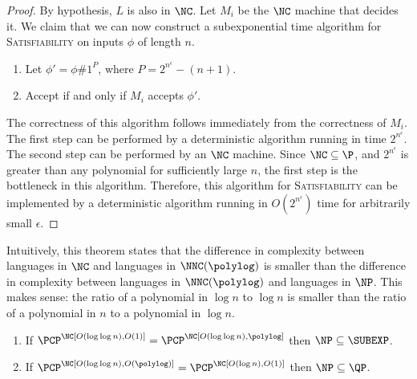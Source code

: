 \documentclass{article}
\newcommand{\loglog}{\log \log}
\begin{document}
\begin{proof}
  By hypothesis, $L$ is also in $\NC$.
  Let $M_i$ be the $\NC$ machine that decides it.
  We claim that we can now construct a subexponential time algorithm for \textsc{Satisfiability} on inputs $\phi$ of length $n$.
  \begin{enumerate}
  \item Let $\phi' = \phi \# 1^P$, where $P = 2^{n^\epsilon} - (n + 1)$.
  \item Accept if and only if $M_i$ accepts $\phi'$.
  \end{enumerate}
  The correctness of this algorithm follows immediately from the correctness of $M_i$.
  The first step can be performed by a deterministic algorithm running in time $2^{n^\epsilon}$.
  The second step can be performed by an $\NC$ machine.
  Since $\NC \subseteq \P$, and $2^{n^\epsilon}$ is greater than any polynomial for sufficiently large $n$, the first step is the bottleneck in this algorithm.
  Therefore, this algorithm for \textsc{Satisfiability} can be implemented by a deterministic algorithm running in $O(2^{n^\epsilon})$ time for arbitrarily small $\epsilon$.
\end{proof}

Intuitively, this theorem states that the difference in complexity between languages in $\NC$ and languages in $\NNC(\polylog)$ is smaller than the difference in complexity between languages in $\NNC(\polylog)$ and languages in $\NP$.
This makes sense: the ratio of a polynomial in $\log n$ to $\log n$ is smaller than the ratio of a polynomial in $n$ to a polynomial in $\log n$.

\begin{corollary}
  \mbox{}
  \begin{enumerate}
  \item If $\PCP^\NC[O(\loglog n), O(1)] = \PCP^\NC[O(\loglog n), \polylog]$ then $\NP \subseteq \SUBEXP$.
  \item If $\PCP^\NC[O(\loglog n), O(\polylog)] = \PCP^\NC[O(\log n), O(1)]$ then $\NP \subseteq \QP$.
  \end{enumerate}
\end{corollary}
\end{document}
